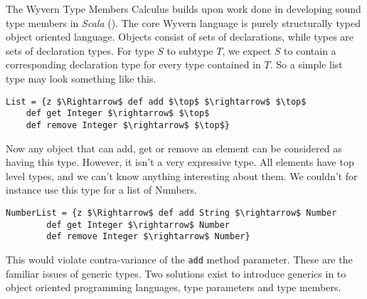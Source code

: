 \documentclass{llncs}
\numberwithin{subcase}{casethm}
\numberwithin{casethm}{theorem}
\numberwithin{casethm}{lemma}
\begin{document}
The Wyvern Type Members Calculus builds upon work 
done in developing sound type members in \emph{Scala} (\cite{Scala Work}).
The core Wyvern language is purely structurally 
typed object oriented language. Objects consist of 
sets of declarations, while types are sets of declaration 
types. For type $S$ to subtype $T$, we expect 
$S$ to contain a corresponding declaration type 
for every type contained in $T$. So a simple list 
type may look something like this.
\begin{lstlisting}[mathescape, style=custom_lang]
List = {z $\Rightarrow$ def add $\top$ $\rightarrow$ $\top$
	def get Integer $\rightarrow$ $\top$
	def remove Integer $\rightarrow$ $\top$}
\end{lstlisting}
Now any object that can add, get or remove an element
can be considered as having this type. However, it isn't 
a very expressive type. All elements have top level types, 
and we can't know anything interesting about them. We 
couldn't for instance use this type for a list of Numbers.
\begin{lstlisting}[mathescape, style=custom_lang]
NumberList = {z $\Rightarrow$ def add String $\rightarrow$ Number
		def get Integer $\rightarrow$ Number
		def remove Integer $\rightarrow$ Number}
\end{lstlisting}
This would violate contra-variance of the 
\texttt{add} method parameter. These are the familiar 
issues of generic types. Two solutions 
exist to introduce generics in to object oriented 
programming languages, type parameters and type members.
\end{document}
